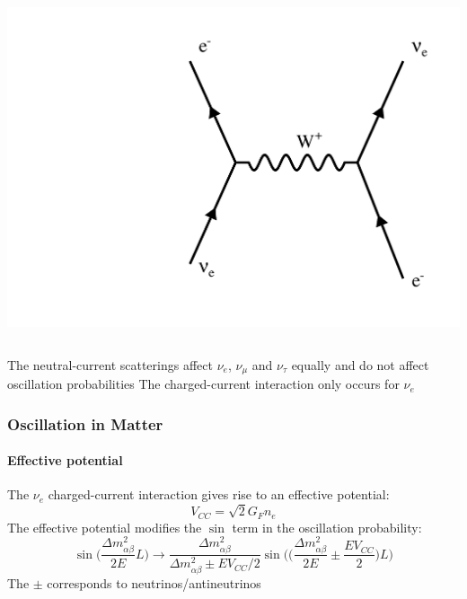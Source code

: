\documentclass[10pt,professionalfonts,xcolor=table]{beamer}
\begin{document}
{\begin{itemize}
\begin{columns}[c]
      \includegraphics[width=\textwidth, angle=-90]{figures/feynman/ccElec.pdf}

\end{columns}
\bang The neutral-current scatterings affect $\nu_e$, $\nu_\mu$ and $\nu_\tau$ equally and do not affect oscillation probabilities
\bang The charged-current interaction only occurs for $\nu_e$

\end{itemize}
}
\frame
{
  \frametitle{Oscillation in Matter}
\begin{itemize}
  \framesubtitle{Effective potential}
\bang The $\nu_e$ charged-current interaction gives rise to an effective potential:
\begin{equation*}
V_{CC} = \sqrt{2}G_F n_e
\end{equation*}
\bang The effective potential modifies the $\sin$ term in the oscillation probability:
\begin{equation*}
\sin\bigg(\frac{\Delta m_{\alpha\beta}^2}{2E}L\bigg) \rightarrow
\frac{\Delta m_{\alpha\beta}^2}{\Delta m_{\alpha\beta}^2 \pm E V_{CC}/2} \sin\bigg(\big(\frac{\Delta m_{\alpha\beta}^2}{2E} \pm \frac{EV_{CC}}{2}\big)L \bigg)
\end{equation*}
\bang The $\pm$ corresponds to neutrinos/antineutrinos
  \end{itemize}
}
\end{document}
